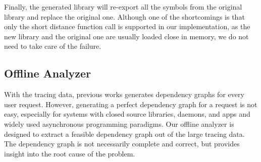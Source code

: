 Finally, the generated library will re-export all the symbols from the original library and replace the original one.
Although one of the shortcomings is that only the short distance function call is supported in our implementation, as the new library and the original one are usually loaded close in memory, we do not need to take care of the failure.\par
\subsection{Offline Analyzer}
With the tracing data, previous works\cite{magpie, panappticon} generates dependency graphs for every user request.
However, generating a perfect dependency graph for a request is not easy, especially for systems with closed source libraries, daemons, and apps and widely used asynchronous programming paradigms.
Our offline analyzer is designed to extract a feasible dependency graph out of the large tracing data.
The dependency graph is not necessarily complete and correct, but provides insight into the root cause of the problem.\par
